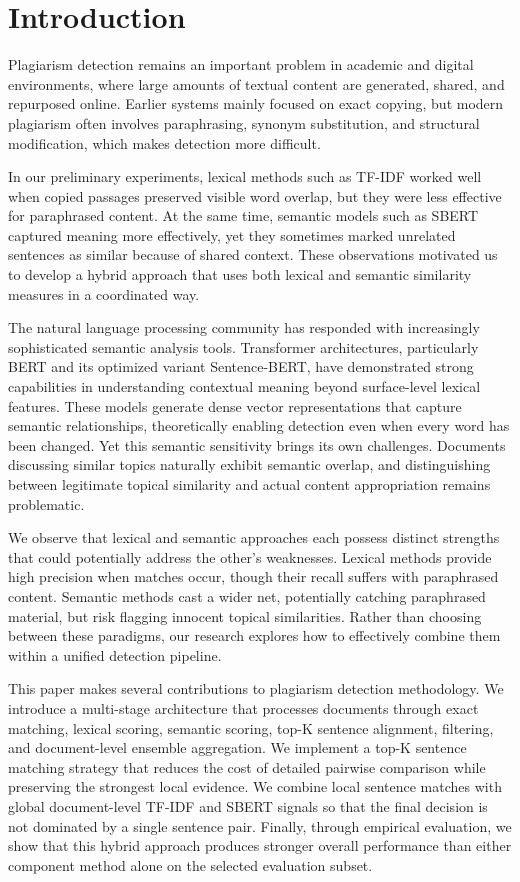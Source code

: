 \documentclass{llncs}
\begin{document}
\section{Introduction}
Plagiarism detection remains an important problem in academic and digital environments, where large amounts of textual content are generated, shared, and repurposed online. Earlier systems mainly focused on exact copying, but modern plagiarism often involves paraphrasing, synonym substitution, and structural modification, which makes detection more difficult.

In our preliminary experiments, lexical methods such as TF-IDF worked well when copied passages preserved visible word overlap, but they were less effective for paraphrased content. At the same time, semantic models such as SBERT captured meaning more effectively, yet they sometimes marked unrelated sentences as similar because of shared context. These observations motivated us to develop a hybrid approach that uses both lexical and semantic similarity measures in a coordinated way.

The natural language processing community has responded with increasingly sophisticated semantic analysis tools. Transformer architectures, particularly BERT and its optimized variant Sentence-BERT, have demonstrated strong capabilities in understanding contextual meaning beyond surface-level lexical features. These models generate dense vector representations that capture semantic relationships, theoretically enabling detection even when every word has been changed. Yet this semantic sensitivity brings its own challenges. Documents discussing similar topics naturally exhibit semantic overlap, and distinguishing between legitimate topical similarity and actual content appropriation remains problematic.

We observe that lexical and semantic approaches each possess distinct strengths that could potentially address the other's weaknesses. Lexical methods provide high precision when matches occur, though their recall suffers with paraphrased content. Semantic methods cast a wider net, potentially catching paraphrased material, but risk flagging innocent topical similarities. Rather than choosing between these paradigms, our research explores how to effectively combine them within a unified detection pipeline.

This paper makes several contributions to plagiarism detection methodology. We introduce a multi-stage architecture that processes documents through exact matching, lexical scoring, semantic scoring, top-K sentence alignment, filtering, and document-level ensemble aggregation. We implement a top-K sentence matching strategy that reduces the cost of detailed pairwise comparison while preserving the strongest local evidence. We combine local sentence matches with global document-level TF-IDF and SBERT signals so that the final decision is not dominated by a single sentence pair. Finally, through empirical evaluation, we show that this hybrid approach produces stronger overall performance than either component method alone on the selected evaluation subset.
\end{document}
